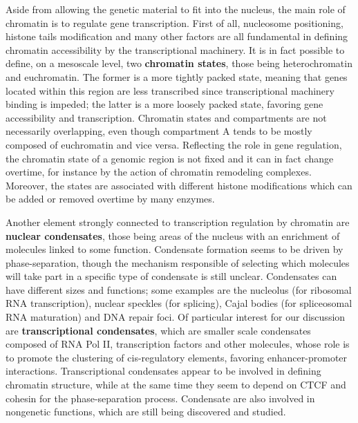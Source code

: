 Aside from allowing the genetic material to fit into the nucleus, the main role of chromatin is to regulate gene transcription. First of all, nucleosome positioning, histone tails modification and many other factors are all fundamental in defining chromatin accessibility by the transcriptional machinery\cite{chromatinfiber2015, histonemodification2007}. It is in fact possible to define, on a mesoscale level, two \textbf{chromatin states}, those being heterochromatin and euchromatin. The former is a more tightly packed state, meaning that genes located within this region are less transcribed since transcriptional machinery binding is impeded; the latter is a more loosely packed state, favoring gene accessibility and transcription\cite{heterochromatin2020}. Chromatin states and compartments are not necessarily overlapping, even though compartment A tends to be mostly composed of euchromatin and vice versa. Reflecting the role in gene regulation, the chromatin state of a genomic region is not fixed and it can in fact change overtime, for instance by the action of chromatin remodeling complexes\cite{chromatinremodeling2021}. Moreover, the states are associated with different histone modifications which can be added or removed overtime by many enzymes\cite{histonemodifications2020, epigeneticbook2020}.

Another element strongly connected to transcription regulation by chromatin are \textbf{nuclear condensates}, those being areas of the nucleus with an enrichment of molecules linked to some function\cite{condensates2023}. Condensate formation seems to be driven by phase-separation, though the mechanism responsible of selecting which molecules will take part in a specific type of condensate is still unclear\cite{phaseseparation2022}. Condensates can have different sizes and functions; some examples are the nucleolus (for ribosomal RNA transcription), nuclear speckles (for splicing), Cajal bodies (for spliceosomal RNA maturation) and DNA repair foci\cite{condensatetypes2020}. Of particular interest for our discussion are \textbf{transcriptional condensates}, which are smaller scale condensates composed of RNA Pol II, transcription factors and other molecules, whose role is to promote the clustering of cis-regulatory elements, favoring enhancer-promoter interactions\cite{condensatecomposition2018, condensateenhancer2018}. Transcriptional condensates appear to be involved in defining chromatin structure, while at the same time they seem to depend on CTCF and cohesin for the phase-separation process\cite{condensatectcf2022, condensatecohesin2021}. Condensate are also involved in nongenetic functions, which are still being discovered and studied\cite{condensates2023}.

